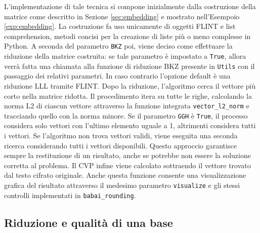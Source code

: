 L'implementazione di tale tecnica si compone inizialmente dalla costruzione della matrice
come descritto in Sezione \ref{sec:embedding} e mostrato nell'Esempoio \ref{exp:embedding}.
La costruzione fa uso unicamente di oggetti FLINT e list comprehension, metodi concisi
per la creazione di liste più o meno complesse in Python. A seconda del parametro \texttt{BKZ}
poi, viene deciso come effettuare la riduzione della matrice costruita: se tale parametro
è impostato a \texttt{True}, allora verrà fatta una chiamata alla funzione di riduzione BKZ presente in \texttt{Utils}
con il passaggio dei relativi parametri. In caso contrario l'opzione default è una riduzione
LLL tramite FLINT.  
Dopo la riduzione, l'algoritmo cerca il vettore più corto nella matrice ridotta. 
Il procedimento itera su tutte le righe, calcolando la norma L2 di ciascun vettore attraverso
la funzione integrata \texttt{vector\_l2\_norm} e tracciando quello con la norma minore.
Se il parametro \texttt{GGH} è \texttt{True}, il processo considera solo vettori con l'ultimo 
elemento uguale a 1, altrimenti considera tutti i vettori. 
Se l'algoritmo non trova vettori validi, viene eseguita una seconda ricerca 
considerando tutti i vettori disponibili. Questo approccio garantisce sempre la restituzione 
di un risultato, anche se potrebbe non essere la soluzione corretta al problema. 
Il CVP infine viene calcolato sottraendo il vettore trovato dal testo cifrato originale.
Anche questa funzione consente una visualizzazione grafica
del risultato attraverso il medesimo parametro \texttt{visualize} e gli stessi controlli 
implementati in \texttt{babai\_rounding}. 

\subsection{Riduzione e qualità di una base}



